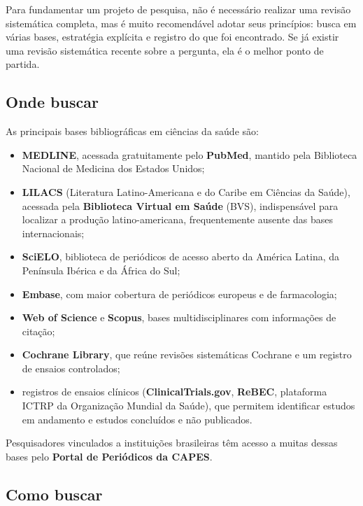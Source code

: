 \documentclass[
]{book}
\providecommand{\tightlist}{%
  \setlength{\itemsep}{0pt}\setlength{\parskip}{0pt}}
\begin{document}
Para fundamentar um projeto de pesquisa, não é necessário realizar uma revisão sistemática completa, mas é muito recomendável adotar seus princípios: busca em várias bases, estratégia explícita e registro do que foi encontrado. Se já existir uma revisão sistemática recente sobre a pergunta, ela é o melhor ponto de partida.

\subsection{Onde buscar}\label{onde-buscar}

As principais bases bibliográficas em ciências da saúde são:

\begin{itemize}
\tightlist
\item
  \textbf{MEDLINE}, acessada gratuitamente pelo \textbf{PubMed}, mantido pela Biblioteca Nacional de Medicina dos Estados Unidos;
\item
  \textbf{LILACS} (Literatura Latino-Americana e do Caribe em Ciências da Saúde), acessada pela \textbf{Biblioteca Virtual em Saúde} (BVS), indispensável para localizar a produção latino-americana, frequentemente ausente das bases internacionais;
\item
  \textbf{SciELO}, biblioteca de periódicos de acesso aberto da América Latina, da Península Ibérica e da África do Sul;
\item
  \textbf{Embase}, com maior cobertura de periódicos europeus e de farmacologia;
\item
  \textbf{Web of Science} e \textbf{Scopus}, bases multidisciplinares com informações de citação;
\item
  \textbf{Cochrane Library}, que reúne revisões sistemáticas Cochrane e um registro de ensaios controlados;
\item
  registros de ensaios clínicos (\textbf{ClinicalTrials.gov}, \textbf{ReBEC}, plataforma ICTRP da Organização Mundial da Saúde), que permitem identificar estudos em andamento e estudos concluídos e não publicados.
\end{itemize}

Pesquisadores vinculados a instituições brasileiras têm acesso a muitas dessas bases pelo \textbf{Portal de Periódicos da CAPES}.

\subsection{Como buscar}\label{como-buscar}
\end{document}
